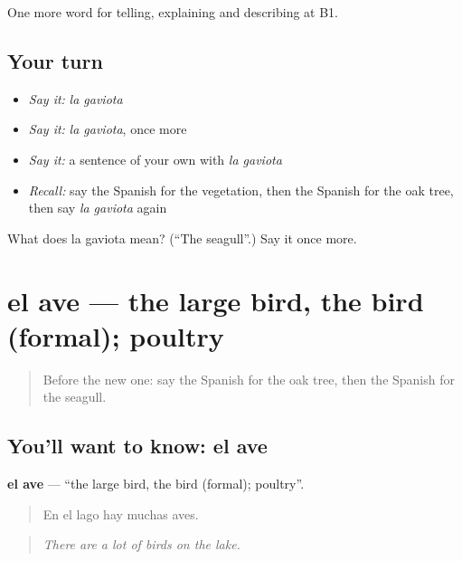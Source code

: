 \begin{grammarlens}[title={What you've built}]
One more word for telling, explaining and describing at B1.
\end{grammarlens}

\subsection*{Your turn}
\begin{itemize}
\raggedright
  \item \emph{Say it:} \emph{la gaviota}
  \item \emph{Say it:} \emph{la gaviota}, once more
  \item \emph{Say it:} a sentence of your own with \emph{la gaviota}
  \item \emph{Recall:} say the Spanish for the vegetation, then the Spanish for the oak tree, then say \emph{la gaviota} again
\end{itemize}

\begin{tcolorbox}[breakable,colback=teal!4,colframe=teal!35!black,title={Before you move on}]
What does la gaviota mean? (\textquotedblleft{}The seagull\textquotedblright{}.) Say it once more.
\end{tcolorbox}
\section[el ave]{el ave — the large bird, the bird (formal); poultry}

\label{lesson:ES-C694-ave}



\begin{quote}
Before the new one: say the Spanish for the oak tree, then the Spanish for the seagull.
\end{quote}

\subsection*{You'll want to know: el ave}
\textbf{el ave} — \textquotedblleft{}the large bird, the bird (formal); poultry\textquotedblright{}.

\begin{quote}
En el lago hay muchas aves.
\end{quote}

\begin{quote}
\emph{There are a lot of birds on the lake.}
\end{quote}

